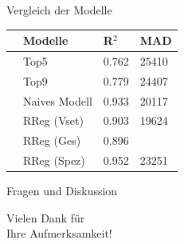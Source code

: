 \documentclass[10pt]{beamer}
\begin{document}
\begin{frame}{Vergleich der Modelle}
\begin{table}[ht]
\centering
\begin{tabular}{rlll}
  \hline
 & Modelle & R$^2$ & MAD \\ 
  \hline
 & Top5 & 0.762 & 25410 \\ 
   & Top9 & 0.779 & 24407 \\ 
   & Naives Modell & 0.933 & 20117 \\ 
   & RReg (Vset) & 0.903 & 19624 \\ 
   & RReg (Ges) & 0.896 &  \\ 
   & RReg (Spez) & 0.952 & 23251 \\ 
   \hline
\end{tabular}
\end{table}

\end{frame}

\begin{frame}{Fragen und Diskussion}
	\begin{LARGE}
		\begin{center}
			Vielen Dank für\\Ihre Aufmerksamkeit!
		\end{center}
	\end{LARGE}
\end{frame}
\end{document}
